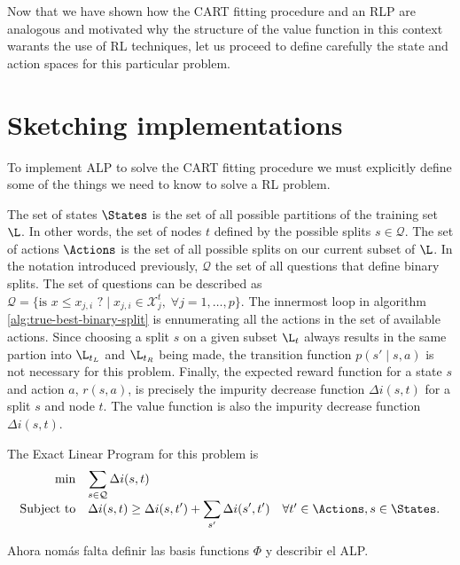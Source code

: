 Now that we have shown how the CART fitting procedure and an RLP are analogous
and motivated why the structure of the value function in this context warants
the use of RL techniques, let us proceed to define carefully the state and
action spaces for this particular problem.

\section{Sketching implementations}

To implement ALP to solve the CART fitting procedure we must explicitly define
some of the things we need to know to solve a RL problem.

The set of states $\States$ is the set of all possible partitions of the
training set $\L$. In other words, the set of nodes $t$ defined by the possible
splits $s \in \mathcal{Q}$. The set of actions $\Actions$ is the set of all
possible splits on our current subset of $\L$. In the notation introduced
previously, $\mathcal{Q}$ the set of all questions that define binary splits.
The set of questions can be described as $\mathcal{Q} = \{ \text{is } x \leq
x_{j, i} \text{ ?} \mid x_{j, i} \in \mathcal{X}_{j}^{t}, \; \forall j = 1,
\dots, p \}$.  The innermost loop in algorithm \ref{alg:true-best-binary-split}
is ennumerating all the actions in the set of available actions. Since choosing
a split $s$ on a given subset $\L_t$ always results in the same partion into
$\L_{t_L}$ and $\L_{t_R}$ being made, the transition function $p(s' \mid s, a)$
is not necessary for this problem. Finally, the expected reward function for a
state $s$ and action $a$, $r(s, a)$, is precisely the impurity decrease function
$\Delta i(s, t)$ for a split $s$ and node $t$. The value function is also the
impurity decrease function $\Delta i (s, t)$.

The Exact Linear Program for this problem is
\begin{equation}
\begin{array}{rl@{}ll}
    \displaystyle \min & \displaystyle \sum_{s \in \mathcal{Q}} \Delta i(s, t) \\
    \text{Subject to} & \displaystyle \Delta i(s, t) \geq \Delta i(s, t') + \sum_{s'} \Delta i(s', t') & \quad \forall t' \in \Actions, s \in \States. \\
\end{array}
\end{equation}

Ahora nomás falta definir las basis functions $\Phi$ y describir el ALP.

